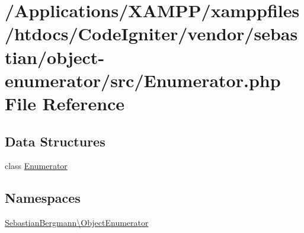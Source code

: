 \hypertarget{_enumerator_8php}{}\section{/\+Applications/\+X\+A\+M\+P\+P/xamppfiles/htdocs/\+Code\+Igniter/vendor/sebastian/object-\/enumerator/src/\+Enumerator.php File Reference}
\label{_enumerator_8php}
\subsection*{Data Structures}
\begin{DoxyCompactItemize}
\item 
class \mbox{\hyperlink{class_sebastian_bergmann_1_1_object_enumerator_1_1_enumerator}{Enumerator}}
\end{DoxyCompactItemize}
\subsection*{Namespaces}
\begin{DoxyCompactItemize}
\item 
 \mbox{\hyperlink{namespace_sebastian_bergmann_1_1_object_enumerator}{Sebastian\+Bergmann\textbackslash{}\+Object\+Enumerator}}
\end{DoxyCompactItemize}

